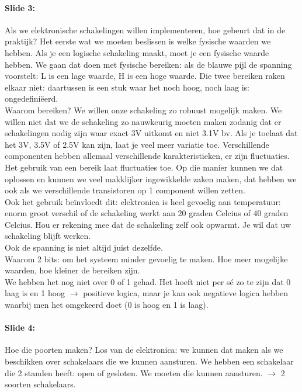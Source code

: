 \documentclass[10pt,a4paper]{book}
\begin{document}
\paragraph{Slide 3:} Als we elektronische schakelingen willen implementeren, hoe gebeurt dat in de praktijk? Het eerste wat we moeten beslissen is welke fysische waarden we hebben. Als je een logische schakeling maakt, moet je een fysische waarde hebben. We gaan dat doen met fysische bereiken: als de blauwe pijl de spanning voorstelt: L is een lage waarde, H is een hoge waarde. Die twee bereiken raken elkaar niet: daartussen is een stuk waar het noch hoog, noch laag is: ongedefini\"eerd.\\
Waarom bereiken? We willen onze schakeling zo robuust mogelijk maken. We willen niet dat we de schakeling zo nauwkeurig moeten maken zodanig dat er schakelingen nodig zijn waar exact 3V uitkomt en niet 3.1V bv. Als je toelaat dat het 3V, 3.5V of 2.5V kan zijn, laat je veel meer variatie toe. Verschillende componenten hebben allemaal verschillende karakteristieken, er zijn fluctuaties. Het gebruik van een bereik laat fluctuaties toe. Op die manier kunnen we dat oplossen en kunnen we veel makklijker ingewikkelde zaken maken, dat hebben we ook als we verschillende transistoren op 1 component willen zetten.\\
Ook het gebruik be\"invloedt dit: elektronica is heel gevoelig aan temperatuur: enorm groot verschil of de schakeling werkt aan 20 graden Celcius of 40 graden Celcius. Hou er rekening mee dat de schakeling zelf ook opwarmt. Je wil dat uw schakeling blijft werken. \\
Ook de spanning is niet altijd juist dezelfde.\\
Waarom 2 bits: om het systeem minder gevoelig te maken. Hoe meer mogelijke waarden, hoe kleiner de bereiken zijn.\\
We hebben het nog niet over 0 of 1 gehad. Het hoeft niet per s\'e zo te zijn dat 0 laag is en 1 hoog $\rightarrow$ positieve logica, maar je kan ook negatieve logica hebben waarbij men het omgekeerd doet (0 is hoog en 1 is laag).

\paragraph{Slide 4:} Hoe die poorten maken? Los van de elektronica: we kunnen dat maken als we beschikken over schakelaars die we kunnen aansturen. We hebben een schakelaar die 2 standen heeft: open of gesloten. We moeten die kunnen aansturen. $\rightarrow$ 2 soorten schakelaars.
\end{document}
